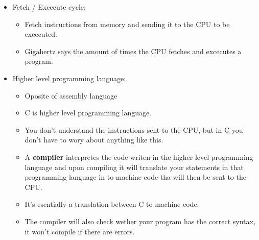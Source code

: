 \begin{itemize}
    \item Fetch / Excecute cycle: 
        \begin{itemize}
            \item Fetch instructions from memory and sending it to the CPU to be excecuted.
            \item Gigahertz says the amount of times the CPU fetches and excecutes a program.
        \end{itemize}

    \item Higher level programming language:  
        \begin{itemize}
            \item Oposite of assembly language 
            \item C is higher level programming language.
            \item You don't understand the instructions sent to the CPU, but in C you don't have to wory about anything like this.
            \item A \textbf{compiler} interpretes the code writen in the higher level programming language and upon compiling it will translate your statements in that programming language in to machine code tha will then be sent to the CPU.
            \item It's esentially a translation between C to machine code.
            \item The compiler will also check wether your program has the correct syntax, it won't compile if there are errors.
        \end{itemize}
\end{itemize}

